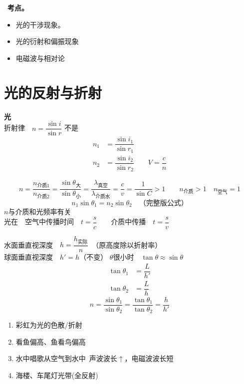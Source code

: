\ \textbf{考点。}
\begin{itemize}
\item 光的干涉现象。
\item 光的衍射和偏振现象
\item 电磁波与相对论
\end{itemize}


\section{光的反射与折射}
\textbf{光}\\[0.8ex]
折射律　$n=\dfrac{\sin i}{\sin r}$
不是
\begin{align*}
n_1&=\dfrac{\sin i_1}{\sin r_1}\\
n_2&=\dfrac{\sin i_2}{\sin r_2}\qquad V=\dfrac{c}{n}
\end{align*}

\[
n=\dfrac{n_{\text{介质1}}}{n_{\text{介质2}}}=\dfrac{\sin\theta_{\text{大}}}{\sin\theta_{\text{小}}}=\dfrac{\lambda_{\text{真空}}}{\lambda_{\text{介质水}}}=\dfrac{c}{v}=\dfrac{1}{\sin C}>1
\qquad n_{\text{介质}}>1\quad n_{\text{空气}}=1
\]
\[
n_1\sin\theta_1=n_2\sin\theta_2\quad\text{（完整版公式）}
\]
$n$与介质和光频率有关\\[1ex]
光在　空气中传播时间　$t=\dfrac{s}{c}$　　介质中传播　$t=\dfrac{s}{v}$

水面垂直视深度　$h=\dfrac{h_{\text{实际}}}{n}$　（原高度除以折射率）\\[0.8ex]
球面垂直视深度　$h'=h$（不变）
$\theta$很小时　$\tan\theta\approx\sin\theta$
\begin{align*}
\tan\theta_1&=\dfrac{L}{h'}\\
\tan\theta_2&=\dfrac{L}{h}
\end{align*}
\[
n=\dfrac{\sin\theta_1}{\sin\theta_2}=\dfrac{\tan\theta_1}{\tan\theta_2}=\dfrac{h}{h'}
\]

\begin{enumerate}
\item 彩虹为光的色散/折射
\item {}看鱼偏高、鱼看鸟偏高
\item 水中唱歌\quad 从空气到水中\ 声波波长$\uparrow$，电磁波波长短
\item 海楼、车尾灯光带(全反射)
\end{enumerate}

